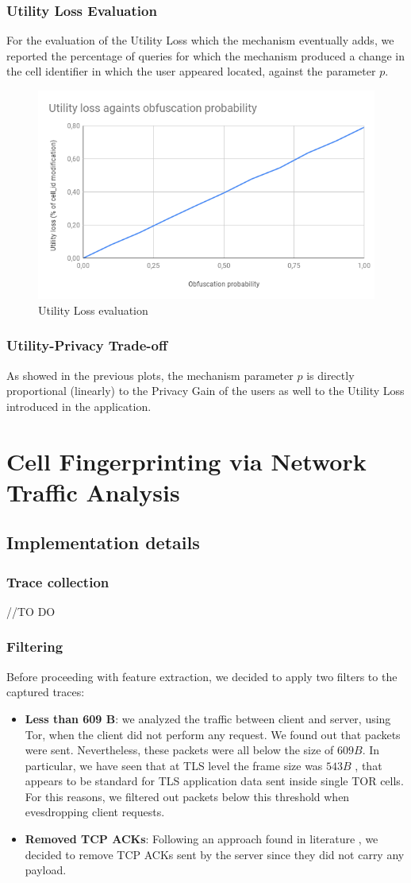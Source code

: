 \documentclass[10pt,conference,compsocconf]{IEEEtran}
\begin{document}
\subsubsection{Utility Loss Evaluation}
For the evaluation of the Utility Loss which the mechanism eventually adds, we
reported the percentage of queries for which the mechanism produced a change in
the cell identifier in which the user appeared located, against the parameter
$p$.
\begin{figure}[h!]
    \centering
    \includegraphics[width=0.5\linewidth]{../privacy_evaluation/defence_evaluation/utility_loss.png}
    \caption{Utility Loss evaluation}
\end{figure}
\subsubsection{Utility-Privacy Trade-off}
As showed in the previous plots, the mechanism parameter $p$ is directly
proportional (linearly) to the Privacy Gain of the users as well to the Utility
Loss introduced in the application.
\section{Cell Fingerprinting via Network Traffic Analysis}

\subsection{Implementation details}
\subsubsection{Trace collection}
//TO DO
\subsubsection{Filtering}
Before proceeding with feature extraction, we decided to apply two filters to the captured traces:
\begin{itemize}
    \item \textbf{Less than 609 B}: we analyzed the traffic between client and server, using Tor, when the client did not perform any request. We found out that packets were sent. Nevertheless, these packets were all below the size of $609B$. In particular, we have seen that at TLS level the frame size was $543 B$ , that appears to be standard for TLS application data sent inside single TOR cells.  For this reasons, we filtered out packets below this threshold when evesdropping client requests.
    \item \textbf{Removed TCP ACKs}: Following an approach found in literature \cite{web_fingerprinting}, we decided to remove TCP ACKs sent by the server since they did not carry any payload.
\end{itemize}
\end{document}
